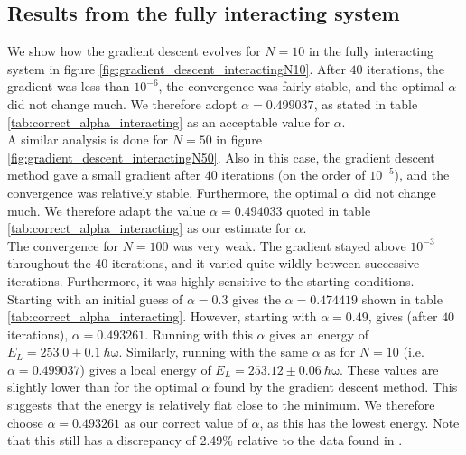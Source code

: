 \documentclass[a4paper, 10pt]{article}
\begin{document}
	 \subsection{Results from the fully interacting system}\label{sec:Disc_Results_from_full}
	 We show how the gradient descent evolves for $N=10$ in the fully interacting system in figure \ref{fig:gradient_descent_interactingN10}. After $40$ iterations, the gradient was less than $10^{-6}$, the convergence was fairly stable, and the optimal $\alpha$ did not change much. We therefore adopt $\alpha = 0.499037$, as stated in table \ref{tab:correct_alpha_interacting} as an acceptable value for $\alpha$.\\
	 \linebreak
	 A similar analysis is done for $N=50$ in figure \ref{fig:gradient_descent_interactingN50}. Also in this case, the gradient descent method gave a small gradient after $40$ iterations (on the order of $10^{-5}$), and the convergence was relatively stable. Furthermore, the optimal $\alpha$ did not change much. We therefore adapt the value $\alpha=0.494033$ quoted in table \ref{tab:correct_alpha_interacting} as our estimate for $\alpha$.\\
	 \linebreak
	 The convergence for $N=100$ was very weak. The gradient stayed above $10^{-3}$ throughout the $40$ iterations, and it varied quite wildly between successive iterations. Furthermore, it was highly sensitive to the starting conditions. Starting with an initial guess of $\alpha=0.3$ gives the $\alpha=0.474419$ shown in table \ref{tab:correct_alpha_interacting}. However, starting with $\alpha=0.49$, gives (after $40$ iterations), $\alpha=0.493261$. Running with this $\alpha$ gives an energy of $E_L=253.0\pm 0.1\ \mathrm{\hbar \omega}$. Similarly, running with the same $\alpha$ as for $N=10$ (i.e. $\alpha=0.499037$) gives a local energy of $E_L=253.12 \pm 0.06\ \mathrm{\hbar \omega}$. These values are slightly lower than for the optimal $\alpha$ found by the gradient descent method. This suggests that the energy is relatively flat close to the minimum. We therefore choose $\alpha=0.493261$ as our correct value of $\alpha$, as this has the lowest energy. Note that this still has a discrepancy of 2.49\% relative to the data found in \cite{Kristiansen2016}.
	 
\end{document}
